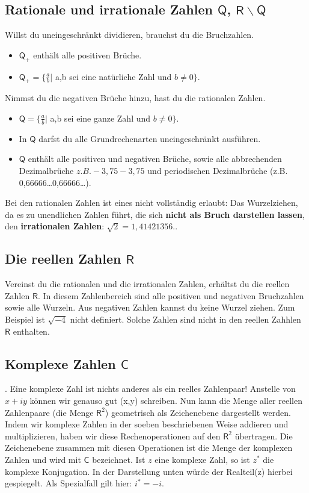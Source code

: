 \documentclass[letterpaper, titlepage]{article}
\begin{document}
\subsection{Rationale und irrationale Zahlen $\mathsf{Q}$, $\mathsf{R \backslash Q}$}\label{Rationale und irrationale Zahlen}
Willst du uneingeschränkt dividieren, brauchst du die Bruchzahlen.
\begin{itemize}
    \item $\mathsf{Q}_+$ enthält alle positiven Brüche.
    \item $\mathsf{Q}_+ = \{\frac{a}{b} \vert$ a,b sei eine natürliche Zahl und $b \neq 0\}$.
\end{itemize} 
Nimmst du die negativen Brüche hinzu, hast du die rationalen Zahlen.
\begin{itemize}
    \item $\mathsf{Q} = \{\frac{a}{b} \vert$ a,b sei eine ganze Zahl und $b \neq 0\}$.
    \item In $\mathsf{Q}$ darfst du alle Grundrechenarten uneingeschränkt ausführen.
    \item $\mathsf{Q}$ enthält alle positiven und negativen Brüche, sowie alle abbrechenden Dezimalbrüche \(z.B. -3,75-3,75\) und periodischen Dezimalbrüche (z.B. 0,66666…0,66666…).
\end{itemize}
Bei den rationalen Zahlen ist eines nicht vollständig erlaubt: Das Wurzelziehen, da es zu unendlichen Zahlen führt, die sich \textbf{nicht als Bruch darstellen lassen}, den \textbf{irrationalen Zahlen}: $\sqrt{2}=1,41421356..$ 
\subsection{Die reellen Zahlen $\mathsf{R}$}\label{Die reellen Zahlen}
Vereinst du die rationalen und die irrationalen Zahlen, erhältst du die reellen Zahlen $\mathsf{R}$. In diesem Zahlenbereich sind alle positiven und negativen Bruchzahlen sowie alle Wurzeln. Aus negativen Zahlen kannst du keine Wurzel ziehen. Zum Beispiel ist $\sqrt{-4}$ nicht definiert. Solche Zahlen sind nicht in den reellen Zahhlen $\mathsf{R}$ enthalten.
\subsection{Komplexe Zahlen $\mathsf{C}$}\label{Komplexe Zahlen}
.\break
\newline
Eine komplexe Zahl ist nichts anderes als ein reelles Zahlenpaar! Anstelle von $x+iy$ können wir genauso gut (x,y) schreiben. Nun kann die Menge aller reellen Zahlenpaare (die Menge $\mathsf{R}^2$) geometrisch als Zeichenebene dargestellt werden. Indem wir komplexe Zahlen in der soeben beschriebenen Weise addieren und multiplizieren, haben wir diese Rechenoperationen auf den $\mathsf{R}^2$ übertragen. Die Zeichenebene zusammen mit diesen Operationen ist die Menge der komplexen Zahlen und wird mit $\mathsf{C}$ bezeichnet. Ist $z$ eine komplexe Zahl, so ist $z^*$ die komplexe Konjugation. In der Darstellung unten würde der Realteil(z) hierbei gespiegelt. Als Spezialfall gilt hier: $i^*=-i$.
\end{document}
